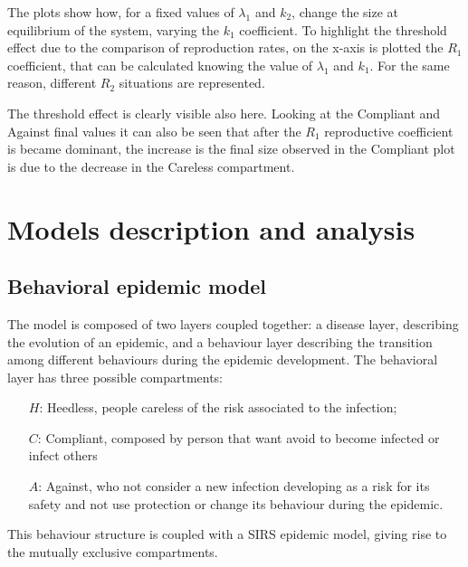 The plots show how, for a fixed values of $\lambda_1$ and $k_2$, change the size at equilibrium of the system, varying the $k_1$ coefficient. To highlight the threshold effect due to the comparison of reproduction rates, on the x-axis is plotted the $R_1$  coefficient, that can be calculated knowing the value of  $\lambda_1$ and $k_1$. For the same reason, different $R_2$ situations are represented. 

The threshold effect is clearly visible also here. Looking at the Compliant and Against final values it can also be seen that after the $R_1$ reproductive coefficient is became dominant, the  increase is the final size observed in the Compliant plot is due to the decrease in the Careless compartment. 





\chapter{Models description and analysis}
\section{Behavioral epidemic model}

The model is composed of two layers coupled together: a disease layer, describing the evolution of an epidemic, and a behaviour layer describing the transition among different behaviours during the epidemic development.
The behavioral layer has three possible compartments: 

\begin{itemize}
	\item[$H$:] Heedless, people careless of the risk associated to the infection;
	\item[$C$:] Compliant, composed by person that want avoid to become infected or infect others
	\item[$A$:] Against, who not consider a new infection developing as a risk for its safety and not use protection or change its behaviour during the epidemic. 
\end{itemize}

This behaviour structure is coupled with a SIRS epidemic model, giving rise to the mutually exclusive compartments.

